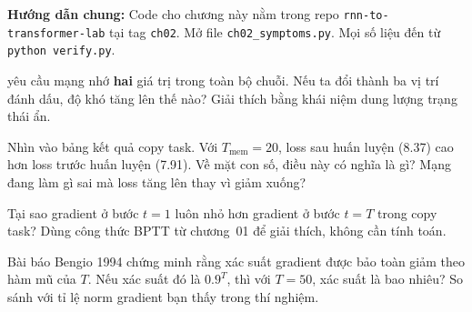 %

\exercises

%

\par\textbf{Hướng dẫn chung:} Code cho chương này nằm trong repo
\texttt{rnn-to-transformer-lab} tại tag \texttt{ch02}.
Mở file \texttt{ch02_symptoms.py}.
Mọi số liệu đến từ \texttt{python verify.py}.

%

\tierunderstand

\begin{bt}
  \item {} yêu cầu mạng nhớ \textbf{hai} giá
    trị trong toàn bộ
    chuỗi. Nếu ta đổi thành ba vị trí đánh dấu, độ khó tăng lên thế nào?
    Giải thích bằng khái niệm dung lượng trạng thái ẩn.

  \item Nhìn vào bảng kết quả copy task. Với $T_{\text{mem}} = 20$, loss
    sau huấn luyện (8.37) cao hơn loss trước huấn luyện (7.91). Về mặt
    con số, điều này có nghĩa là gì? Mạng đang làm gì sai mà loss tăng
    lên thay vì giảm xuống?

  \item Tại sao gradient ở bước $t=1$ luôn nhỏ hơn gradient ở bước $t=T$
    trong copy task? Dùng công thức BPTT từ chương~01 để giải thích, không
    cần tính toán.

  \item Bài báo Bengio 1994 chứng minh rằng xác suất gradient được bảo
    toàn giảm theo hàm mũ của $T$. Nếu xác suất đó là $0.9^T$, thì với
    $T=50$, xác suất là bao nhiêu? So sánh với tỉ lệ norm gradient bạn
    thấy trong thí nghiệm.
\end{bt}

\tierapply

%

